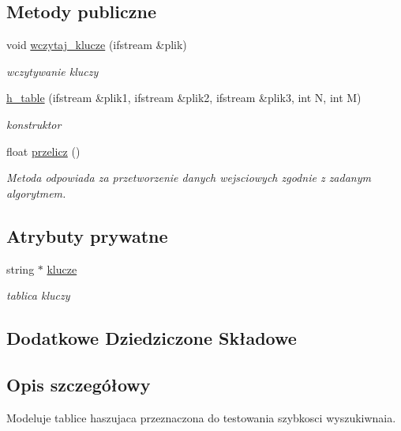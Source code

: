 \subsection*{Metody publiczne}
\begin{DoxyCompactItemize}
\item 
void \hyperlink{classh__table_a938885a9ce57ae0c447dd9a146637ce9}{wczytaj\-\_\-klucze} (ifstream \&plik)
\begin{DoxyCompactList}\small\item\em wczytywanie kluczy \end{DoxyCompactList}\item 
\hyperlink{classh__table_add097e1c13f110997c50b57f7d5e4cf5}{h\-\_\-table} (ifstream \&plik1, ifstream \&plik2, ifstream \&plik3, int N, int M)
\begin{DoxyCompactList}\small\item\em konstruktor \end{DoxyCompactList}\item 
float \hyperlink{classh__table_a8726955778aed30773dccf8e0cb81064}{przelicz} ()
\begin{DoxyCompactList}\small\item\em Metoda odpowiada za przetworzenie danych wejsciowych zgodnie z zadanym algorytmem. \end{DoxyCompactList}\end{DoxyCompactItemize}
\subsection*{Atrybuty prywatne}
\begin{DoxyCompactItemize}
\item 
string $\ast$ \hyperlink{classh__table_af7ef9b7c0043f4320e5b8fd9ce3678d5}{klucze}
\begin{DoxyCompactList}\small\item\em tablica kluczy \end{DoxyCompactList}\end{DoxyCompactItemize}
\subsection*{Dodatkowe Dziedziczone Składowe}


\subsection{Opis szczegółowy}
Modeluje tablice haszujaca przeznaczona do testowania szybkosci wyszukiwnaia. 

